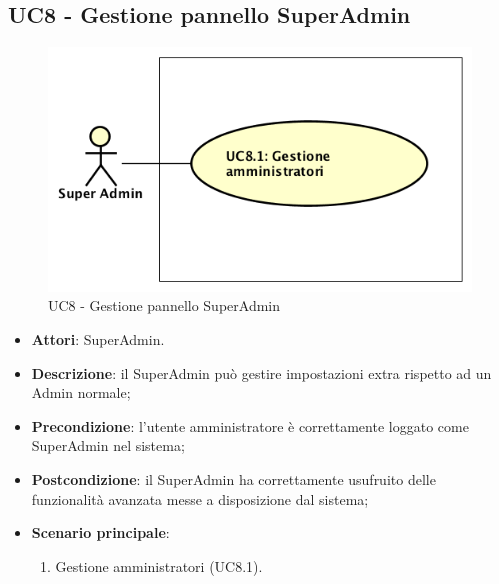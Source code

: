 \documentclass[../AnalisiDeiRequisiti_v3.0.0.tex]{subfiles}
\begin{document}
\subsection{UC8 - Gestione pannello SuperAdmin} 
\label{sssec:UC8} 
\begin{figure}[!h]
	\centering
	\includegraphics[width=\textwidth]{UseCases/UC8_GestionePannelloSuperadmin/UC8_GestionePannelloSuperadmin.png}
	\caption{UC8 - Gestione pannello SuperAdmin}
\end{figure}
\begin{itemize} 
\item \textbf{Attori}: SuperAdmin.
\item \textbf{Descrizione}: il SuperAdmin può gestire impostazioni extra rispetto ad un Admin normale;
\item \textbf{Precondizione}: l'utente amministratore è correttamente loggato come SuperAdmin nel sistema;
\item \textbf{Postcondizione}: il SuperAdmin ha correttamente usufruito delle funzionalità avanzata messe a disposizione dal sistema;
\item \textbf{Scenario principale}: \begin{enumerate}\item Gestione amministratori (UC8.1). 
 \end{enumerate}
\end{itemize} 
\newpage
\end{document}
